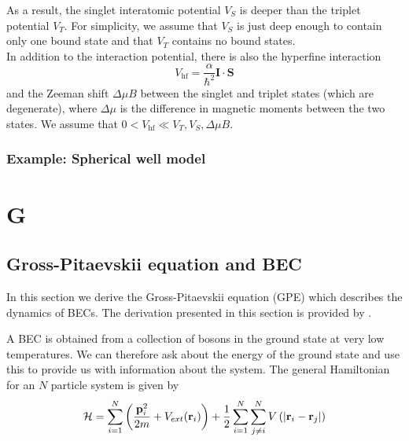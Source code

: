 \documentclass{book}
\theoremstyle{definition}
\newcommand{\ham}{\mathcal{H}}
\newcommand{\al}{\alpha}
\newcommand{\f}[2]{\frac{#1}{#2}}
\newcommand{\lp}{\left(}
\newcommand{\rp}{\right)}
\begin{document}
As a result, the singlet interatomic potential $V_S$ is deeper than the triplet potential $V_T$. For simplicity, we assume that $V_S$ is just deep enough to contain only one bound state and that $V_T$ contains no bound states.\\


In addition to the interaction potential, there is also the hyperfine interaction
\begin{equation*}
V_\text{hf} = \f{\al}{\hbar^2} \mathbf{I}\cdot \mathbf{S}
\end{equation*}
and the Zeeman shift $\Delta \mu B$ between the singlet and triplet states (which are degenerate), where $\Delta \mu$ is the difference in magnetic moments between the two states. We assume that $0< V_\text{hf} \ll V_T,V_S,\Delta \mu B$. 


\subsection*{Example: Spherical well model}









\chapter*{G}


\section{Gross-Pitaevskii equation and BEC}

In this section we derive the Gross-Pitaevskii equation (GPE) which describes the dynamics of BECs. The derivation presented in this section is provided by \cite{rogel2013gross}. 


A BEC is obtained from a collection
of bosons in the ground state at very low temperatures. We can therefore ask about
the energy of the ground state and use this to provide us with information about the
system. The general Hamiltonian for an $N$ particle system is given by 
\begin{equation*}
\ham = \sum^N_{i=1} \lp \f{\mathbf{p}_i^2}{2m} + V_{ext}(\mathbf{r}_i) \rp + \f{1}{2}\sum^N_{i=1}\sum^N_{j\neq i}V\lp \abs{\mathbf{r}_i - \mathbf{r}_j} \rp
\end{equation*}
\end{document}
